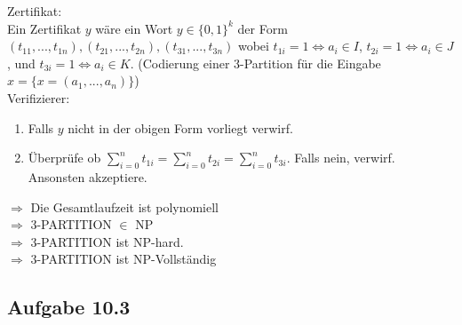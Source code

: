 Zertifikat:\\
Ein Zertifikat $y$ wäre ein Wort $y \in \{0, 1\}^k$ der Form $(t_{11},...,t_{1n}), (t_{21},...,t_{2n}), (t_{31},...,t_{3n})$ wobei
$t_{1i} = 1 \Leftrightarrow a_i \in I$, $t_{2i} = 1 \Leftrightarrow a_i \in J$, und $t_{3i} = 1 \Leftrightarrow a_i \in K$. (Codierung einer 3-Partition für die Eingabe $x = \{x = (a_1,...,a_n)\}$)\\

Verifizierer:
\begin{enumerate}
	\item Falls $y$ nicht in der obigen Form vorliegt verwirf.
	\item Überprüfe ob $\sum_{i = 0}^{n} t_{1i} = \sum_{i=0}^{n} t_{2i} = \sum_{i=0}^{n} t_{3i}$. Falls nein, verwirf. Ansonsten 
	akzeptiere.
\end{enumerate}

$\Rightarrow$ Die Gesamtlaufzeit ist polynomiell\\
$\Rightarrow$ 3-PARTITION $\in$ NP\\
$\Rightarrow$ 3-PARTITION ist NP-hard.\\

$\Rightarrow$ 3-PARTITION ist NP-Vollständig


\subsection*{Aufgabe 10.3}
